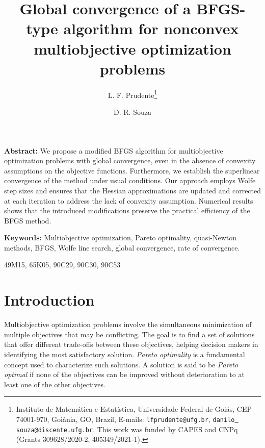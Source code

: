 \documentclass[11pt]{article}
\numberwithin{assumption}{section}
\begin{document}
\title{Global convergence of a BFGS-type algorithm for nonconvex multiobjective optimization problems}
\author{
L. F. Prudente\thanks{Instituto de Matem\'atica e Estat\'istica, Universidade Federal de Goi\'as,  CEP 74001-970, Goi\^ania, GO, Brazil, E-mails: {\tt  lfprudente@ufg.br},  {\tt  danilo\underline{ }souza@discente.ufg.br}. This work was funded by CAPES and CNPq (Grants 309628/2020-2, 405349/2021-1).}
\and
D. R. Souza\footnotemark[1]
}
\maketitle


\maketitle

\maketitle
\vspace{.5cm}

\noindent


\noindent
{\bf Abstract:} 
We propose a modified BFGS algorithm for multiobjective optimization problems with global convergence, even in the absence of convexity assumptions on the objective functions. Furthermore, we establish the superlinear convergence of the method under usual conditions. Our approach employs Wolfe step sizes and ensures that the Hessian approximations are updated and corrected at each iteration to address the lack of convexity assumption. Numerical results shows that the introduced modifications preserve the practical efficiency of the BFGS method.

\vspace{8pt}
\noindent
{\bf Keywords:} Multiobjective optimization, Pareto optimality, quasi-Newton methods, BFGS, Wolfe line search, global convergence, rate of convergence.

\vspace{8pt}
 49M15, 65K05, 90C29, 90C30, 90C53



\section{Introduction} 

Multiobjective optimization problems involve the simultaneous minimization of multiple objectives that may be conflicting.
The goal is to find a set of solutions that offer different trade-offs between these objectives, helping decision makers in identifying the most satisfactory solution. {\it Pareto optimality} is a fundamental concept used to characterize such solutions. A solution is said to be {\it Pareto optimal} if none of the objectives can be improved without deterioration to at least one of the other objectives. 
\end{document}
